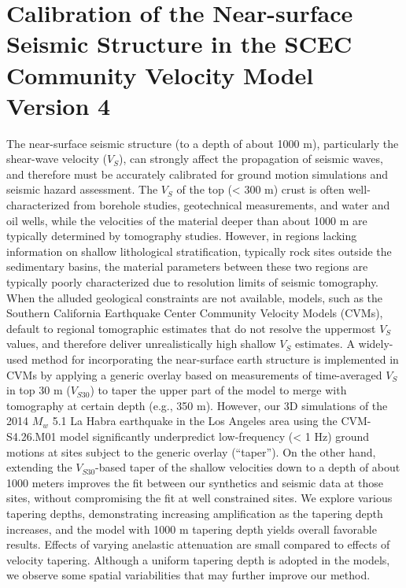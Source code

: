 
\linespread{1.7}
\chapter{Calibration of the Near-surface Seismic Structure in the SCEC Community Velocity Model Version 4}
\linespread{2.0}
\label{chap:vs30}

\graphicspath{{/Users/zhh076/work/PhD_way/vs30/}}

The near-surface seismic structure (to a depth of about 1000 m), particularly the shear-wave velocity ($V_S$), can strongly affect the propagation of seismic waves, and therefore must be accurately calibrated for ground motion simulations and seismic hazard assessment. The $V_S$ of the top (< 300 m) crust is often well-characterized from borehole studies, geotechnical measurements, and water and oil wells, while the velocities of the material deeper than about 1000 m are typically determined by tomography studies. However, in regions lacking information on shallow lithological stratification, typically rock sites outside the sedimentary basins, the material parameters between these two regions are typically poorly characterized due to resolution limits of seismic tomography. When the alluded geological constraints are not available, models, such as the Southern California Earthquake Center Community Velocity Models (CVMs), default to regional tomographic estimates that do not resolve the uppermost $V_S$ values, and therefore deliver unrealistically high shallow $V_S$ estimates. A widely-used method for incorporating the near-surface earth structure is implemented in CVMs by applying a generic overlay based on measurements of time-averaged $V_S$ in top 30 m ($V_{S30}$) to taper the upper part of the model to merge with tomography at certain depth (e.g., 350 m). However, our 3D simulations of the 2014 $M_w$ 5.1 La Habra earthquake in the Los Angeles area using the CVM-S4.26.M01 model significantly underpredict low-frequency (< 1 Hz) ground motions at sites subject to the generic overlay (``taper''). On the other hand, extending the $V_{S30}$-based taper of the shallow velocities down to a depth of about 1000 meters improves the fit between our synthetics and seismic data at those sites, without compromising the fit at well constrained sites. We explore various tapering depths, demonstrating increasing amplification as the tapering depth increases, and the model with 1000 m tapering depth yields overall favorable results. Effects of varying anelastic attenuation are small compared to effects of velocity tapering. Although a uniform tapering depth is adopted in the models, we observe some spatial variabilities that may further improve our method.


